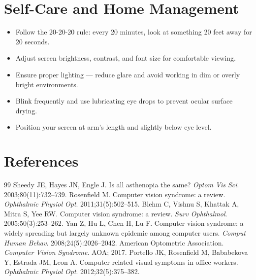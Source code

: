 \section*{Self-Care and Home Management}
\begin{itemize}
  \item Follow the 20-20-20 rule: every 20 minutes, look at something 20 feet away for 20 seconds.
  \item Adjust screen brightness, contrast, and font size for comfortable viewing.
  \item Ensure proper lighting — reduce glare and avoid working in dim or overly bright environments.
  \item Blink frequently and use lubricating eye drops to prevent ocular surface drying.
  \item Position your screen at arm's length and slightly below eye level.
\end{itemize}

\section*{References}
\begin{thebibliography}{99}
Sheedy JE, Hayes JN, Engle J. Is all asthenopia the same? \textit{Optom Vis Sci}. 2003;80(11):732--739.
Rosenfield M. Computer vision syndrome: a review. \textit{Ophthalmic Physiol Opt}. 2011;31(5):502--515.
Blehm C, Vishnu S, Khattak A, Mitra S, Yee RW. Computer vision syndrome: a review. \textit{Surv Ophthalmol}. 2005;50(3):253--262.
Yan Z, Hu L, Chen H, Lu F. Computer vision syndrome: a widely spreading but largely unknown epidemic among computer users. \textit{Comput Human Behav}. 2008;24(5):2026--2042.
American Optometric Association. \textit{Computer Vision Syndrome}. AOA; 2017.
Portello JK, Rosenfield M, Bababekova Y, Estrada JM, Leon A. Computer-related visual symptoms in office workers. \textit{Ophthalmic Physiol Opt}. 2012;32(5):375--382.
\end{thebibliography}
